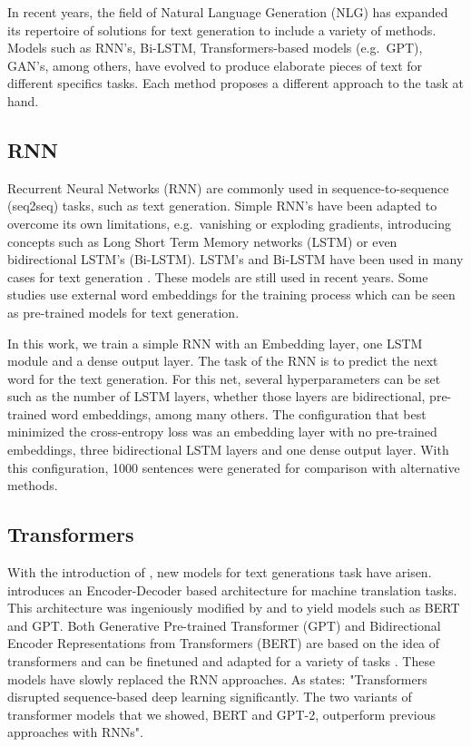 \documentclass[10pt,twocolumn,letterpaper]{article}
\begin{document}
In recent years, the field of Natural Language Generation (NLG) has expanded its repertoire
of solutions for text generation to include a variety of methods.
Models such as RNN's, Bi-LSTM, Transformers-based models (e.g.\ GPT), GAN's, among others, have evolved
to produce elaborate pieces of text for different specifics tasks.
Each method proposes a different approach to the task at hand.

\subsection{RNN}

Recurrent Neural Networks (RNN) are commonly used in sequence-to-sequence (seq2seq) tasks, such as text generation.
Simple RNN's have been adapted to overcome its own limitations, e.g.\ vanishing or exploding gradients,
introducing concepts such as Long Short Term Memory networks (LSTM) or even bidirectional LSTM's (Bi-LSTM).
LSTM's and Bi-LSTM have been used in many cases for text generation \cite{Bengali} \cite{lstm1} \cite{lstm2} \cite{lstm3}.
These models are still used in recent years.
Some studies \cite{embedds} use external word embeddings for the training process which can be seen as pre-trained
models for text generation.

In this work, we train a simple RNN with an Embedding layer, one LSTM module and a dense output layer.
The task of the RNN is to predict the next word for the text generation.
For this net, several hyperparameters can be set such as the number of LSTM layers, whether those layers
are bidirectional, pre-trained word embeddings, among many others.
The configuration that best minimized the cross-entropy loss was an embedding layer with no pre-trained embeddings,
three bidirectional LSTM layers and one dense output layer.
With this configuration, 1000 sentences were generated for comparison with alternative methods.

\subsection{Transformers}

With the introduction of \cite{attention}, new models for text generations task have arisen.
\cite{attention} introduces an Encoder-Decoder based architecture for machine translation tasks.
This architecture was ingeniously modified by \cite{bert} and \cite{gpt} to yield models such as BERT and GPT.
Both Generative Pre-trained Transformer (GPT) and Bidirectional Encoder Representations from Transformers (BERT)
are based on the idea of transformers and can be finetuned and
adapted for a variety of tasks \cite{gptapps1} \cite{gptapps2} \cite{gptapps3} \cite{gptapps4} \cite{gptapps5}.
These models have slowly replaced the RNN approaches.
As \cite{modernMethods} states: "Transformers disrupted sequence-based deep learning significantly.
The two variants of transformer models that we showed, BERT and GPT-2, outperform
previous approaches with RNNs".
\end{document}
